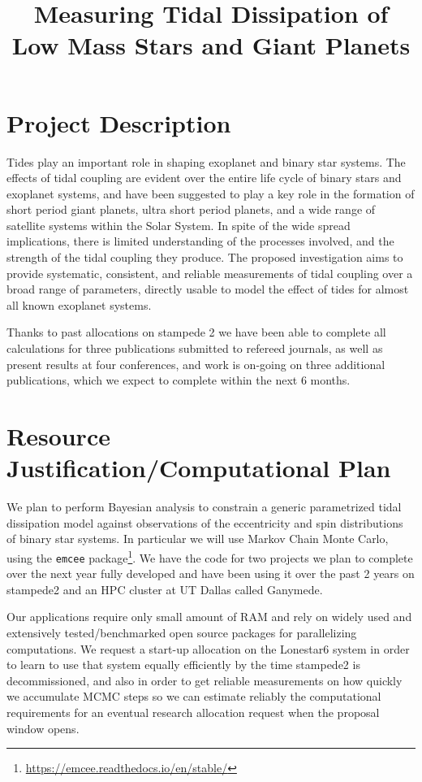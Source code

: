 \documentclass{article}
\title{Measuring Tidal Dissipation of Low Mass Stars and Giant Planets}
\begin{document}
\maketitle

\section{Project Description}

Tides play an important role in shaping exoplanet and binary star systems. The
effects of tidal coupling are evident over the entire life cycle of binary stars
and exoplanet systems, and have been suggested to play a key role in the
formation of short period giant planets, ultra short period planets, and a wide
range of satellite systems within the Solar System. In spite of the wide spread
implications, there is limited understanding of the processes involved, and the
strength of the tidal coupling they produce. The proposed investigation aims to
provide systematic, consistent, and reliable measurements of tidal coupling over
a broad range of parameters, directly usable to model the effect of tides for
almost all known exoplanet systems.

Thanks to past allocations on stampede 2 we have been able to complete all
calculations for three publications submitted to refereed journals, as well as
present results at four conferences, and work is on-going on three additional
publications, which we expect to complete within the next 6 months.

\section{Resource Justification/Computational Plan}

We plan to perform Bayesian analysis to constrain a generic parametrized tidal
dissipation model against observations of the eccentricity and spin
distributions of binary star systems. In particular we will use Markov Chain
Monte Carlo, using the \texttt{emcee}
package\footnote{\url{https://emcee.readthedocs.io/en/stable/}}. We have the
code for two projects we plan to complete over the next year fully developed and
have been using it over the past 2 years on stampede2 and an HPC cluster at UT
Dallas called Ganymede.


Our applications require only small amount of RAM and rely on widely used and
extensively tested/benchmarked open source packages for parallelizing
computations. We request a start-up allocation on the Lonestar6 system in order
to learn to use that system equally efficiently by the time stampede2 is
decommissioned, and also in order to get reliable measurements on how quickly we
accumulate MCMC steps so we can estimate reliably the computational requirements
for an eventual research allocation request when the proposal window opens.
\end{document}
